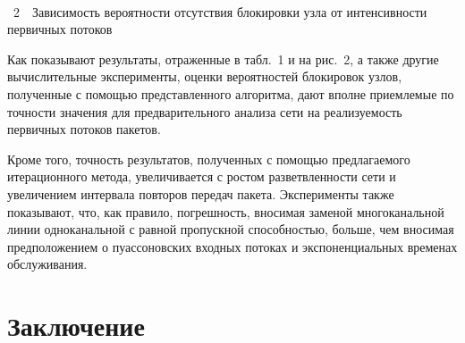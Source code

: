      \begin{multicols}{2}
     
      
\noindent
\begin{center} %
\vspace*{2pt}
\mbox{%
\epsfxsize=79.963mm
}
\end{center}
\vspace*{-6pt}
{{\figurename~2}\ \ \small{Зависимость вероятности отсутствия блокировки узла от 
интенсивности первичных потоков}}


\bigskip
\addtocounter{figure}{1}
     
     Как показывают результаты, отраженные в табл.~1 и на рис.~2, а также 
другие вычислительные эксперименты, оценки вероятностей блокировок узлов, 
полученные с помощью представленного алгоритма, дают вполне приемлемые 
по точности значения для предварительного анализа сети на реализуемость 
первичных потоков пакетов.
         
     Кроме того, точность результатов, полученных с помощью предлагаемого 
итерационного метода, увеличивается с ростом разветвленности сети и 
увеличением интервала повторов передач пакета. Эксперименты также 
показывают, что, как правило, погрешность, вносимая заменой многоканальной 
линии одноканальной с равной пропускной способностью, больше, чем 
вносимая предположением о пуассоновских входных потоках и 
экспоненциальных временах обслуживания.
     
\section{Заключение}
     

\end{multicols}
